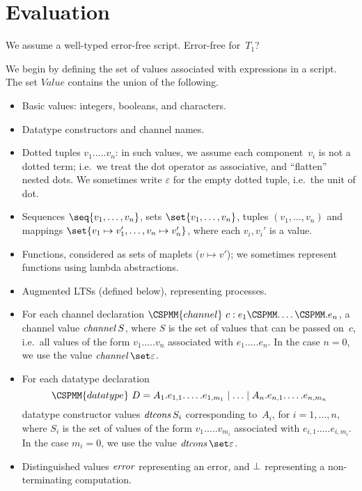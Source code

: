 \section{Evaluation}

We assume a well-typed error-free script.  \framebox{**} Error-free for~$T_1$? 

We begin by defining the set of values associated with expressions in a
script.  The set $Value$ contains the union of the following. 
%
\begin{itemize}
\item Basic values: integers, booleans, and characters.

\item Datatype constructors and channel names.

\item Dotted tuples $v_1.\ldots.v_n$: in such values, we assume each
  component~$v_i$ is not a dotted term; i.e.~we treat the dot operator as
  associative, and ``flatten'' nested dots.  We sometimes write $\varepsilon$
  for the empty dotted tuple, i.e.~the unit of dot.

\item Sequences $\seq{v_1,\ldots,v_n}$, sets
  $\set{v_1,\ldots,v_n}$, tuples $(v_1,\ldots,v_n)$ and mappings
  $\set{v_1 \mapsto v_1', \ldots, v_n \mapsto v_n'}$, where each $v_i, v_i'$
  is a value.

\item Functions, considered as sets of maplets ($v \mapsto v'$); we sometimes
  represent functions using lambda abstractions.

\item Augmented LTSs (defined below), representing processes.

\item For each channel declaration $\CSPMM{channel}~c : e_1\M.\ldots\M.e_n$, a
  channel value $\mathop{\it channel} S$, where $S$ is the set of values that can be
  passed on~$c$, i.e.~all values of the form $v_1.\ldots.v_n$ associated with
  $e_1.\ldots.e_n$.  In the case $n=0$, we use the value
  $\channel \set\varepsilon$.  

\item For each datatype declaration
\[
\CSPMM{datatype}~D = 
  A_1.e_{1,1}.\ldots.e_{1,m_1} \mid \ldots \mid A_n.e_{n,1}.\ldots.e_{n,m_n}
\]
datatype constructor values $\mathop{\it dtcons} S_i$ corresponding to~$A_i$, for
$i = 1,\ldots,n$, where $S_i$ is the set of values of the form
$v_1.\ldots.v_{m_i}$ associated with $e_{i,1}.\ldots.e_{i,m_i}$.  In the case
$m_i=0$, we use the value $\dtcons\set\varepsilon$.

\item Distinguished values $\mathord{\it error}$ representing an error, and $\perp$
  representing a non-terminating computation.
\end{itemize}

